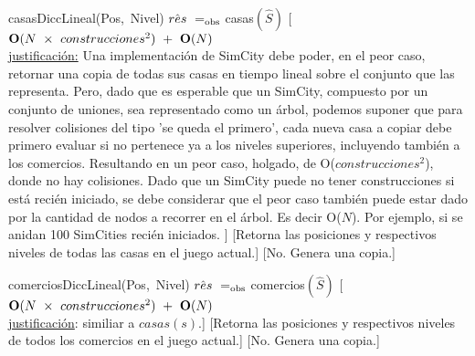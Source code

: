 \begin{Interfaz}
    \InterfazFuncion
    {casas}{}{DiccLineal(Pos,\ Nivel)}
    {$\hat{res}\ \igobs\ $casas$(\hat{S})$}
    [$\bold{O}(N\ \times\ construcciones^{2})\ +\ \bold{O}(N)$ %
        \\ \underline{justificación:} Una implementación de SimCity debe poder, en el peor caso, retornar una copia de todas sus casas en tiempo lineal sobre el conjunto que las representa. Pero, dado que es esperable que un SimCity, compuesto por un conjunto de uniones, sea representado como un árbol, podemos suponer que para resolver colisiones del tipo 'se queda el primero', cada nueva casa a copiar debe primero evaluar si no pertenece ya a los niveles superiores, incluyendo también a los comercios. Resultando en un peor caso, holgado, de O($construcciones^2$), donde no hay colisiones. Dado que un SimCity puede no tener construcciones si está recién iniciado, se debe considerar que el peor caso también puede estar dado por la cantidad de nodos a recorrer en el árbol. Es decir O($N$). Por ejemplo, 
        si se anidan 100 SimCities recién iniciados. 
    ]
    [Retorna las posiciones y respectivos niveles de todas las casas en el juego actual.]
    [No. Genera una copia.]

    \InterfazFuncion
    {comercios}{}{DiccLineal(Pos,\ Nivel)}
    {$\hat{res}\ \igobs\ $comercios$(\hat{S})$}
    [$\bold{O}(N\ \times\ construcciones^{2})\ +\ \bold{O}(N)$
    \\ \underline{justificación}: similiar a $casas(s)$.] %
    [Retorna las posiciones y respectivos niveles de todos los comercios en el juego actual.]
    [No. Genera una copia.]


\end{Interfaz}
